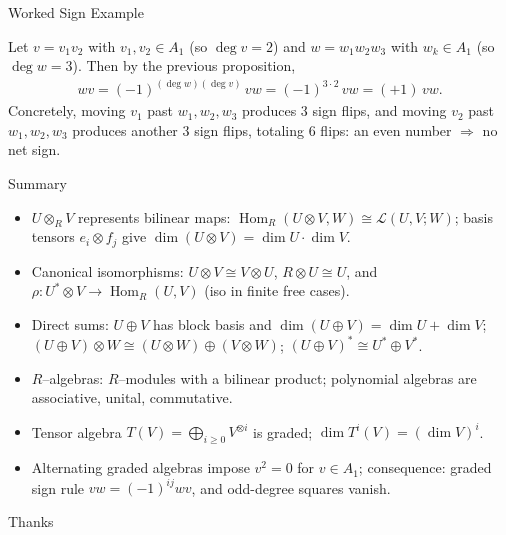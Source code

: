 \begin{frame}{Worked Sign Example}
\begin{block}{}

\end{block}
Let $v=v_1 v_2$ with $v_1,v_2\in A_1$ (so $\deg v=2$) and $w=w_1 w_2 w_3$ with $w_k\in A_1$ (so $\deg w=3$).
Then by the previous proposition,
\begin{align*}
w v = (-1)^{(\deg w)(\deg v)}\, v w = (-1)^{3\cdot 2}\, v w = (+1)\, v w.
\end{align*}
Concretely, moving $v_1$ past $w_1,w_2,w_3$ produces $3$ sign flips, and moving $v_2$ past $w_1,w_2,w_3$ produces another $3$ sign flips, totaling $6$ flips: an even number $\Rightarrow$ no net sign.
\end{frame}

\begin{frame}{Summary}
\begin{itemize}
\item $U\otimes_R V$ represents bilinear maps: $\operatorname{Hom}_R(U\otimes V,W)\cong \mathcal{L}(U,V;W)$; basis tensors $e_i\otimes f_j$ give $\dim(U\otimes V)=\dim U\cdot \dim V$.
\item Canonical isomorphisms: $U\otimes V \cong V\otimes U$, $R\otimes U \cong U$, and $\rho:U^*\otimes V\to \operatorname{Hom}_R(U,V)$ (iso in finite free cases).
\item Direct sums: $U\oplus V$ has block basis and $\dim(U\oplus V)=\dim U+\dim V$; $(U\oplus V)\otimes W \cong (U\otimes W)\oplus (V\otimes W)$; $(U\oplus V)^*\cong U^*\oplus V^*$.
\item $R$–algebras: $R$–modules with a bilinear product; polynomial algebras are associative, unital, commutative.
\item Tensor algebra $T(V)=\bigoplus_{i\ge 0} V^{\otimes i}$ is graded; $\dim T^i(V)= (\dim V)^i$.
\item Alternating graded algebras impose $v^2=0$ for $v\in A_1$; consequence: graded sign rule $vw=(-1)^{ij}wv$, and odd-degree squares vanish.
\end{itemize}
\end{frame}

\begin{frame}{Thanks}
  \cmcendframe
\end{frame}


